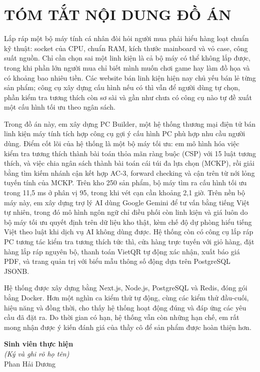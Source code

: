 \chapter*{\centering TÓM TẮT NỘI DUNG ĐỒ ÁN}

Lắp ráp một bộ máy tính cá nhân đòi hỏi người mua phải hiểu hàng loạt chuẩn kỹ thuật: socket của CPU, chuẩn RAM, kích thước mainboard và vỏ case, công suất nguồn. Chỉ cần chọn sai một linh kiện là cả bộ máy có thể không lắp được, trong khi phần lớn người mua chỉ biết mình muốn chơi game hay làm đồ họa và có khoảng bao nhiêu tiền. Các website bán linh kiện hiện nay chủ yếu bán lẻ từng sản phẩm; công cụ xây dựng cấu hình nếu có thì vẫn để người dùng tự chọn, phần kiểm tra tương thích còn sơ sài và gần như chưa có công cụ nào tự đề xuất một cấu hình tối ưu theo ngân sách.

Trong đồ án này, em xây dựng PC Builder, một hệ thống thương mại điện tử bán linh kiện máy tính tích hợp công cụ gợi ý cấu hình PC phù hợp nhu cầu người dùng. Điểm cốt lõi của hệ thống là một bộ máy tối ưu: em mô hình hóa việc kiểm tra tương thích thành bài toán thỏa mãn ràng buộc (CSP) với 15 luật tương thích, và việc chia ngân sách thành bài toán cái túi đa lựa chọn (MCKP), rồi giải bằng tìm kiếm nhánh cận kết hợp AC-3, forward checking và cận trên từ nới lỏng tuyến tính của MCKP. Trên kho 250 sản phẩm, bộ máy tìm ra cấu hình tối ưu trong 11,5 ms ở phân vị 95, trong khi vét cạn cần khoảng 2,1 giờ. Trên nền bộ máy này, em xây dựng trợ lý AI dùng Google Gemini để tư vấn bằng tiếng Việt tự nhiên, trong đó mô hình ngôn ngữ chỉ điều phối còn linh kiện và giá luôn do bộ máy tối ưu quyết định trên dữ liệu kho thật, kèm chế độ dự phòng hiểu tiếng Việt theo luật khi dịch vụ AI không dùng được. Hệ thống còn có công cụ lắp ráp PC tương tác kiểm tra tương thích tức thì, cửa hàng trực tuyến với giỏ hàng, đặt hàng lắp ráp nguyên bộ, thanh toán VietQR tự động xác nhận, xuất báo giá PDF, và trang quản trị với biểu mẫu thông số động dựa trên PostgreSQL JSONB.

Hệ thống được xây dựng bằng Next.js, Node.js, PostgreSQL và Redis, đóng gói bằng Docker. Hơn một nghìn ca kiểm thử tự động, cùng các kiểm thử đầu-cuối, hiệu năng và đồng thời, cho thấy hệ thống hoạt động đúng và đáp ứng các yêu cầu đã đặt ra. Do thời gian có hạn, hệ thống vẫn còn những hạn chế, em rất mong nhận được ý kiến đánh giá của thầy cô để sản phẩm được hoàn thiện hơn.

\vspace{0.4cm}
\begin{flushright}
\begin{minipage}{6cm}\centering
\textbf{Sinh viên thực hiện}\\
\textit{(Ký và ghi rõ họ tên)}\\[1.6cm]
Phan Hải Dương
\end{minipage}
\end{flushright}
